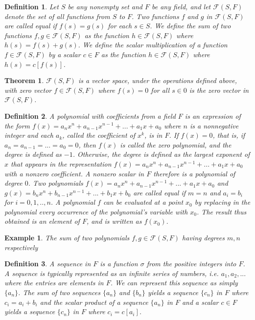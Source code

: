 \documentclass[a4paper]{article}
\newtheorem{mytheorem}{Theorem}
\newtheorem{example}{Example}
\newtheorem{mydef}{Definition}
\numberwithin{mytheorem}{section}
\numberwithin{mydef}{section}
\numberwithin{example}{section}
\begin{document}
\begin{mydef} Let $S$ be any nonempty set and $F$ be any field, and let $\mathcal{F}(S,F)$ denote the set of all functions from $S$ to $F$. Two functions $f$ and $g$ in $\mathcal{F}(S,F)$ are called equal if $f(s) = g(s)$ for each $s \in S$. We define the sum of two functions $f,g \in \mathcal{F}(S,F)$ as the function $h \in \mathcal{F}(S,F) $ where $h(s) = f(s) + g(s)$. We define the scalar multiplication of a function $f \in \mathcal{F}(S,F) $ by a scalar $c \in F$ as the function $h \in \mathcal{F}(S,F) $ where $h(s) = c[f(s)]$.  
\end{mydef}

\begin{mytheorem} $\mathcal{F}(S,F)$ is a vector space, under the operations defined above, with zero vector $f \in \mathcal{F}(S,F)$ where $f(s) = 0$ for all $s \in 0$ is the zero vector in $\mathcal{F}(S,F)$.   \end{mytheorem}

\begin{mydef} A polynomial with coefficients from a field $F$ is an expression of the form $f(x) = a_{n}x^{n} + a_{n-1}x^{n-1} + ... + a_{1}x + a_{0}$ where $n$ is a nonnegative integer and each $a_{k}$, called the coefficient of $x^{k}$, is in $F$. If $f(x) = 0$, that is, if $a_{n} = a_{n-1} = ... = a_{0} = 0$, then $f(x)$ is called the zero polynomial, and the degree is defined as $-1$. Otherwise, the degree is defined as the largest exponent of $x$ that appears in the representation $f(x) = a_{n}x^{n} + a_{n-1}x^{n-1} + ... + a_{1}x + a_{0}$ with a nonzero coefficient. A nonzero scalar in $F$ therefore is a polynomial of degree $0$. Two polynomials $f(x) = a_{n}x^{n} + a_{n-1}x^{n-1} + ... + a_{1}x + a_{0}$ and $g(x) = b_{n}x^{n} + b_{n-1}x^{n-1} + ... + b_{1}x + b_{0}$ are called equal if $m = n$ and $a_{i} = b_{i}$ for $i = 0,1,..,n$. A polynomial $f$ can be evaluated at a point $x_{0}$ by replacing in the polynomial every occurrence of the polynomial's variable with $x_{0}$. The result thus obtained is an element of $F$, and is written as $f(x_{0})$.
\end{mydef}

\begin{example}
The sum of two polynomials $f,g \in \mathcal{F}(S,F)$ having degrees $m,n$ respectively 
\end{example}

\begin{mydef} A sequence in $F$ is a function $\sigma$ from the positive integers into $F$. A sequence is typically represented as an infinite series of numbers, i.e.  $a_{1},a_{2},...$ where the entries are elements in $F$. We can represent this sequence as simply $\{ a_{n} \}$. The sum of two sequences $\{ a_{n} \}$ and $\{ b_{n} \}$ yields a sequence $\{ c_{n} \}$ in $F$ where $c_{i} = a_{i} + b_{i}$ and the scalar product of a sequence $\{ a_{n} \}$ in $F$ and a scalar $c \in F$ yields a sequence $\{ c_{n} \}$ in $F$ where $c_{i} = c[a_{i}]$.  
\end{mydef}
\end{document}
